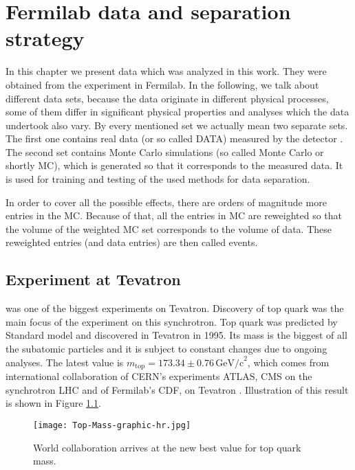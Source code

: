 \chapter{Fermilab data and separation strategy}

In this chapter we present data which was analyzed in this work. They were obtained from the experiment \dzero in Fermilab. In the following, we talk about different data sets, because the data originate in different physical processes, some of them differ in significant physical properties and analyses which the data undertook also vary. By every mentioned set we actually mean two separate sets. The first one contains real data (or so called DATA) measured by the detector \dzero. The second set contains Monte Carlo simulations (so called Monte Carlo or shortly MC), which is generated so that it corresponds to the measured data. It is used for training and testing of the used methods for data separation.

In order to cover all the possible effects, there are orders of magnitude more entries in the MC. Because of that, all the entries in MC are reweighted so that the volume of the weighted MC set corresponds to the volume of data. These reweighted entries (and data entries) are then called events.

\section{\texorpdfstring{\dzero}{D0} Experiment at Tevatron}
\dzero was one of the biggest experiments on Tevatron. Discovery of top quark was the main focus of the \dzero experiment on this synchrotron. Top quark was predicted by Standard model and discovered in Tevatron in 1995. Its mass is the biggest of all the subatomic particles and it is subject to constant changes due to ongoing analyses. The latest value is $m_\mathrm{top} = 173.34 \pm 0.76 \,\mathrm{GeV/c}^2 $, which comes from international collaboration of CERN's experiments ATLAS, CMS on the synchrotron LHC and of Fermilab's CDF, \dzero on Tevatron \cite{jointMass}. Illustration of this result is shown in Figure \ref{fig:jointMass}. 

\begin{figure}[h]
	\centering
	\texttt{[image: Top-Mass-graphic-hr.jpg]}
	\caption{World collaboration arrives at the new best value for top quark mass.}
	\label{fig:jointMass}
\end{figure}

